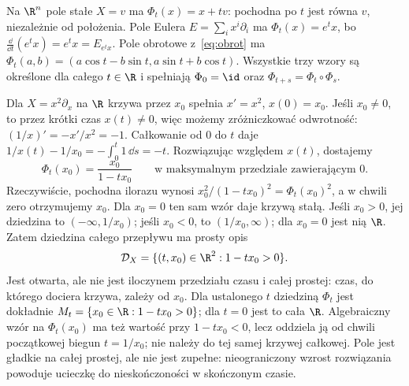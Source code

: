 \begin{przyklad}
Na $\R^n$ pole stałe $X=v$ ma $\Phi_t(x)=x+tv$:
pochodna po $t$ jest równa $v$, niezależnie od położenia.
Pole Eulera $E=\sum_i x^i\partial_i$ ma $\Phi_t(x)=e^t x$,
bo $\frac{\dd}{\dd t}(e^t x)=e^t x=E_{e^t x}$.
Pole obrotowe z~\eqref{eq:obrot} ma
$\Phi_t(a,b)=(a\cos t-b\sin t,a\sin t+b\cos t)$.
Wszystkie trzy wzory są określone dla całego $t\in\R$ i
spełniają $\Phi_0=\id$ oraz $\Phi_{t+s}=\Phi_t\circ\Phi_s$.
\end{przyklad}

\begin{przyklad}\label{prz:niezupelne}
Dla $X=x^2\partial_x$ na $\R$ krzywa przez $x_0$ spełnia
$x'=x^2$, $x(0)=x_0$. Jeśli $x_0\ne0$, to przez krótki
czas $x(t)\ne0$, więc możemy zróżniczkować odwrotność:
$(1/x)'=-x'/x^2=-1$.
Całkowanie od $0$ do $t$ daje
$1/x(t)-1/x_0=-\int_0^t1\,\dd s=-t$.
Rozwiązując względem $x(t)$, dostajemy
\[
 \Phi_t(x_0)=\frac{x_0}{1-tx_0}
 \qquad\text{w maksymalnym przedziale zawierającym }0.
\]
Rzeczywiście, pochodna ilorazu wynosi
$x_0^2/(1-tx_0)^2=\Phi_t(x_0)^2$, a w chwili zero
otrzymujemy $x_0$. Dla $x_0=0$ ten sam wzór daje krzywą stałą.
Jeśli $x_0>0$, jej dziedzina to $(-\infty,1/x_0)$; jeśli $x_0<0$,
to $(1/x_0,\infty)$; dla $x_0=0$ jest nią $\R$.
Zatem dziedzina całego przepływu ma prosty opis
\[
\mathcal D_X=\{(t,x_0)\in\R^2:1-tx_0>0\}.
\]
Jest otwarta, ale nie jest iloczynem przedziału czasu i
całej prostej: czas, do którego dociera krzywa, zależy od $x_0$.
Dla ustalonego $t$ dziedziną $\Phi_t$ jest dokładnie
$M_t=\{x_0\in\R:1-tx_0>0\}$; dla $t=0$ jest to cała $\R$.
Algebraiczny wzór na $\Phi_t(x_0)$ ma też wartość przy
$1-tx_0<0$, lecz oddziela ją od chwili początkowej biegun
$t=1/x_0$; nie należy do tej samej krzywej całkowej.
Pole jest gładkie na całej prostej,
ale nie jest zupełne: nieograniczony wzrost rozwiązania powoduje
ucieczkę do nieskończoności w skończonym czasie.
\end{przyklad}

